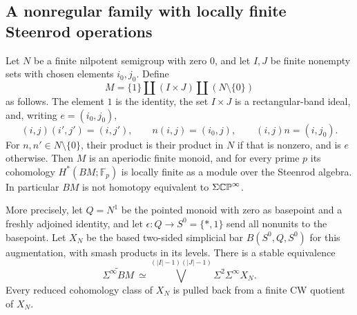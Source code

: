 \subsection{A nonregular family with locally finite Steenrod operations}

\begin{theorem}\label{E:nilpotent-inflations}
Let $N$ be a finite nilpotent semigroup with zero $0$, and let $I,J$
be finite nonempty sets with chosen elements $i_0,j_0$.  Define
\[
 M=\{1\}\amalg(I\times J)\amalg(N\setminus\{0\})
\]
as follows.  The element $1$ is the identity, the set $I\times J$ is a
rectangular-band ideal, and, writing $e=(i_0,j_0)$,
\[
 (i,j)(i',j')=(i,j'),\qquad
 n(i,j)=(i_0,j),\qquad (i,j)n=(i,j_0).
\]
For $n,n'\in N\setminus\{0\}$, their product is their product in $N$
if that is nonzero, and is $e$ otherwise.
Then $M$ is an aperiodic finite monoid, and for every prime $p$ its
cohomology $H^*(BM;\mathbb F_p)$ is locally finite as a module over the
Steenrod algebra.  In particular $BM$ is not homotopy equivalent to
$\Sigma\mathbb {CP}^\infty$.

More precisely, let $Q=N^1$ be the pointed monoid with zero as basepoint
and a freshly adjoined identity, and let
$\epsilon:Q\to S^0=\{*,1\}$ send all nonunits to the basepoint.
Let $X_N$ be the based two-sided simplicial bar
$B(S^0,Q,S^0)$ for this augmentation, with smash products in its levels.
There is a stable equivalence
\[
 \widetilde{\Sigma^\infty BM}\ \simeq
 \bigvee^{(|I|-1)(|J|-1)}\Sigma^2\Sigma^\infty X_N.       \tag{E.20}
\]
Every reduced cohomology class of $X_N$ is pulled back from a finite
CW quotient of $X_N$.
\end{theorem}

